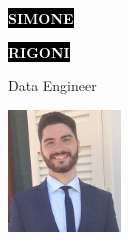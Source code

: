 \documentclass[9pt]{developercv} %
\begin{document}

\begin{minipage}[t]{0.375\textwidth} %
	\vspace{-\baselineskip} %
	
	\colorbox{black}{{\HUGE\textcolor{white}{\textbf{\MakeUppercase{Simone}}}}} %
	
	\colorbox{black}{{\HUGE\textcolor{white}{\textbf{\MakeUppercase{Rigoni}}}}} %
	
	\vspace{6pt}
	
	{\huge Data Engineer} %
\end{minipage}
\begin{minipage}[t]{0.225\textwidth} %
	\vspace{-\baselineskip} %
	
	\includegraphics[width=3cm]{image_1}
\end{minipage}
\end{document}
